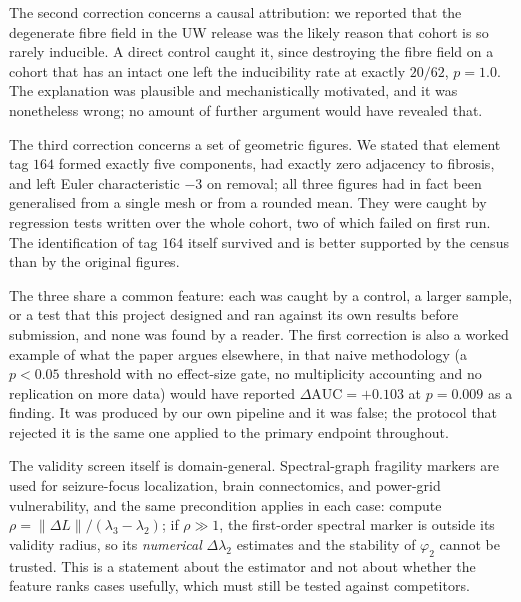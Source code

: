 \documentclass[11pt]{article}
\theoremstyle{definition}
\newcommand{\lam}{\lambda}
\newcommand{\phii}{\varphi}
\newcommand{\rhoval}{\rho}
\newcommand{\dAUC}{\Delta\mathrm{AUC}}
\begin{document}
The second correction concerns a causal attribution: we reported that the
degenerate fibre field in the UW release was the likely reason that cohort is so
rarely inducible. A direct control caught it, since destroying the fibre field on
a cohort that has an intact one left the inducibility rate at exactly $20/62$,
$p=1.0$. The explanation was plausible and mechanistically motivated, and it was
nonetheless wrong; no amount of further argument would have revealed that.

The third correction concerns a set of geometric figures. We stated that element
tag $164$ formed exactly five components, had exactly zero adjacency to fibrosis,
and left Euler characteristic $-3$ on removal; all three figures had in fact been
generalised from a single mesh or from a rounded mean. They were caught by
regression tests written over the whole cohort, two of which failed on first run.
The identification of tag $164$ itself survived and is better supported by the
census than by the original figures.

The three share a common feature: each was caught by a control, a larger sample,
or a test that this project designed and ran against its own results before
submission, and none was found by a reader. The first correction is also a worked
example of what the paper argues elsewhere, in that naive methodology (a $p<0.05$
threshold with no effect-size gate, no multiplicity accounting and no replication
on more data) would have reported $\dAUC=+0.103$ at $p=0.009$ as a finding. It
was produced by our own pipeline and it was false; the protocol that rejected it
is the same one applied to the primary endpoint throughout.

The validity screen itself is
domain-general. Spectral-graph fragility markers are used for seizure-focus
localization, brain connectomics, and power-grid vulnerability, and the same
precondition applies in each case: compute
$\rhoval=\lVert\Delta L\rVert/(\lam_3-\lam_2)$; if
$\rhoval\gg1$, the first-order spectral marker is outside its validity radius, so
its \emph{numerical} $\Delta\lam_2$ estimates and the stability of $\phii_2$
cannot be trusted. This is a statement about the estimator and not about whether
the feature ranks cases usefully, which must still be tested against competitors.
\end{document}

